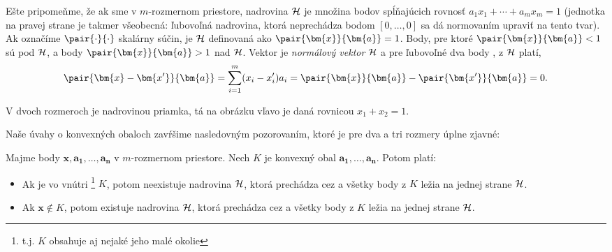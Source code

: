 \begin{shaded}
\begin{minipage}[t]{6cm}
\begin{center}

\end{center}

\end{minipage}\hspace*{1cm}\begin{minipage}[t]{\textwidth-7cm}
  \vspace{0pt}
Ešte pripomeňme, že ak  sme v $m$-rozmernom priestore, nadrovina $\cal H$ je množina bodov  spĺňajúcich
rovnosť $a_1x_1+\cdots+a_mx_m=1$ (jednotka na pravej strane je takmer všeobecná:
ľubovoľná nadrovina, ktorá neprechádza bodom $[0,\ldots,0]$ sa dá normovaním upraviť
na tento tvar). Ak označíme $\pair{\cdot}{\cdot}$ skalárny súčin, je
$\cal H$ definovaná ako $\pair{\bm{x}}{\bm{a}}=1$. 
Body, pre ktoré $\pair{\bm{x}}{\bm{a}}<1$ sú pod $\cal H$, a body
$\pair{\bm{x}}{\bm{a}}>1$ nad $\cal H$.
Vektor  je {\em normálový vektor} $\cal H$ a pre ľubovoľné dva body ,  z $\cal H$ platí,
$$\pair{\bm{x}-\bm{x'}}{\bm{a}}=\sum_{i=1}^m(x_i-x'_i)a_i=\pair{\bm{x}}{\bm{a}}-\pair{\bm{x'}}{\bm{a}}=0.$$

\noindent
V dvoch rozmeroch je nadrovinou priamka, tá na obrázku vľavo je daná rovnicou
$x_1+x_2=1$.

\end{minipage}

\noindent
Naše  úvahy o konvexných obaloch zavŕšime nasledovným pozorovaním, ktoré je
pre dva a tri rozmery úplne zjavné:

\begin{lema}
  \label{lm:KO:2}
  Majme body $\bm{x},\bm{a_1},\ldots,\bm{a_n}$ v $m$-rozmernom priestore. Nech $K$ je konvexný obal
  $\bm{a_1},\ldots,\bm{a_n}$. Potom platí:
  \begin{itemize}
    \item 
      Ak  je vo vnútri  \footnote{t.j. $K$ obsahuje  aj nejaké jeho malé okolie} $K$,
      potom neexistuje nadrovina $\cal H$, ktorá prechádza cez  a všetky body z $K$
      ležia na jednej strane $\cal H$.
    \item 
      Ak $\bm{x} \not\in K$,
      potom existuje nadrovina $\cal H$, ktorá prechádza cez  a všetky body z $K$
      ležia na jednej strane $\cal H$.
  \end{itemize}
\end{lema}


\end{shaded}
